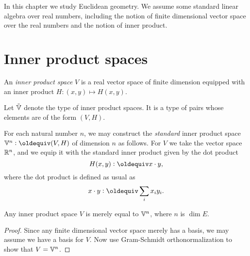 

In this chapter we study Euclidean geometry.  We assume some standard linear
algebra over real numbers, including the notion of finite dimensional vector
space over the real numbers and the notion of inner product.

\section{Inner product spaces}

\begin{definition}\label{def:InnerProductSpace}
  An {\em inner product space} $V$ is a real vector space of finite dimension
  equipped with an inner product $H : (x,y) \mapsto H( x,y )$.
\end{definition}

Let ${\tilde {\mathbb V}}$ denote the type of inner product spaces.  It is a type of pairs whose
elements are of the form $(V,H)$.

For each natural number $n$, we may construct the {\em standard} inner product
space $\VV^n \defeq (V,H)$ of dimension $n$ as follows.  For $V$ we take the
vector space $\mathbb{R}^n$, and we equip it with the standard inner product given by
the dot product
$$ H ( x , y) \defeq x \cdot y, $$
where the dot product is defined as usual as
$$ x \cdot y \defeq \sum_i x_i y_i . $$

\begin{theorem}\label{thm:GramSchmidt}
  Any inner product space $V$ is merely equal to $\mathbb V^n$, where $n$ is $\dim E$.
\end{theorem}

\begin{proof}
  Since any finite dimensional vector space merely has a basis, we may assume
  we have a basis for $V$.  Now use Gram-Schmidt orthonormalization to show
  that $V = \mathbb V^n$.
\end{proof}

